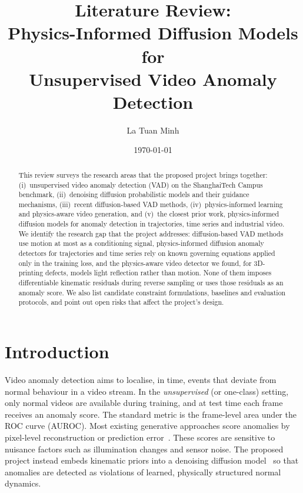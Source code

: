 \documentclass[11pt,a4paper]{article}
\title{Literature Review:\\Physics-Informed Diffusion Models for\\Unsupervised Video Anomaly Detection}
\author{La Tuan Minh}
\date{\today}
\begin{document}
\maketitle

\begin{abstract}
This review surveys the research areas that the proposed project brings together: (i)~unsupervised video anomaly detection (VAD) on the ShanghaiTech Campus benchmark, (ii)~denoising diffusion probabilistic models and their guidance mechanisms, (iii)~recent diffusion-based VAD methods, (iv)~physics-informed learning and physics-aware video generation, and (v)~the closest prior work, physics-informed diffusion models for anomaly detection in trajectories, time series and industrial video. We identify the research gap that the project addresses: diffusion-based VAD methods use motion at most as a conditioning signal, physics-informed diffusion anomaly detectors for trajectories and time series rely on known governing equations applied only in the training loss, and the physics-aware video detector we found, for 3D-printing defects, models light reflection rather than motion. None of them imposes differentiable kinematic residuals during reverse sampling or uses those residuals as an anomaly score. We also list candidate constraint formulations, baselines and evaluation protocols, and point out open risks that affect the project's design.
\end{abstract}

\section{Introduction}
Video anomaly detection aims to localise, in time, events that deviate from normal behaviour in a video stream. In the \emph{unsupervised} (or one-class) setting, only normal videos are available during training, and at test time each frame receives an anomaly score. The standard metric is the frame-level area under the ROC curve (AUROC). Most existing generative approaches score anomalies by pixel-level reconstruction or prediction error~\cite{hasan2016learning,liu2018future}. These scores are sensitive to nuisance factors such as illumination changes and sensor noise. The proposed project instead embeds kinematic priors into a denoising diffusion model~\cite{ho2020ddpm} so that anomalies are detected as violations of learned, physically structured normal dynamics.

\end{document}
